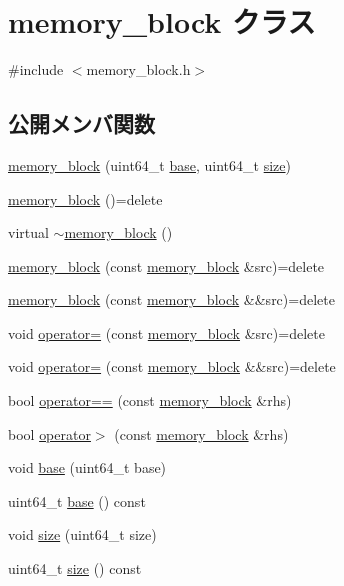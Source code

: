 \hypertarget{classmemory__block}{}\section{memory\+\_\+block クラス}
\label{classmemory__block}


{\ttfamily \#include $<$memory\+\_\+block.\+h$>$}

\subsection*{公開メンバ関数}
\begin{DoxyCompactItemize}
\item 
\hyperlink{classmemory__block_a5e72abe346014b328921130d6576ffaa}{memory\+\_\+block} (uint64\+\_\+t \hyperlink{classmemory__block_a739d675f86d7e2a9f0082b2e6e4d827f}{base}, uint64\+\_\+t \hyperlink{classmemory__block_adb448dde189fdedec8793fd3dcb4674a}{size})
\item 
\hyperlink{classmemory__block_a811ecbeacc0921a0ec8fd0f94a97682d}{memory\+\_\+block} ()=delete
\item 
virtual \hyperlink{classmemory__block_a88261ad8b59e2dcae15ba37a0e4f9c88}{$\sim$memory\+\_\+block} ()
\item 
\hyperlink{classmemory__block_ab43debaedcdcacb2f269047bb3308d5e}{memory\+\_\+block} (const \hyperlink{classmemory__block}{memory\+\_\+block} \&src)=delete
\item 
\hyperlink{classmemory__block_aeae2474076d174f3ea9279c180e8252c}{memory\+\_\+block} (const \hyperlink{classmemory__block}{memory\+\_\+block} \&\&src)=delete
\item 
void \hyperlink{classmemory__block_ae6f96e210fcddb0390b69ebf544100dc}{operator=} (const \hyperlink{classmemory__block}{memory\+\_\+block} \&src)=delete
\item 
void \hyperlink{classmemory__block_a192afb96e0361d057f0933119d42dc6f}{operator=} (const \hyperlink{classmemory__block}{memory\+\_\+block} \&\&src)=delete
\item 
bool \hyperlink{classmemory__block_a2622810f660307cb9d39516973abac9b}{operator==} (const \hyperlink{classmemory__block}{memory\+\_\+block} \&rhs)
\item 
bool \hyperlink{classmemory__block_abba4d7c05d916aafc08b58187fd92fad}{operator$>$} (const \hyperlink{classmemory__block}{memory\+\_\+block} \&rhs)
\item 
void \hyperlink{classmemory__block_a739d675f86d7e2a9f0082b2e6e4d827f}{base} (uint64\+\_\+t base)
\item 
uint64\+\_\+t \hyperlink{classmemory__block_a4f2105c2b57c74998ad60cd973fb6a2d}{base} () const
\item 
void \hyperlink{classmemory__block_adb448dde189fdedec8793fd3dcb4674a}{size} (uint64\+\_\+t size)
\item 
uint64\+\_\+t \hyperlink{classmemory__block_a61bb79beaeb712e3ea9896058af4eda4}{size} () const
\end{DoxyCompactItemize}
